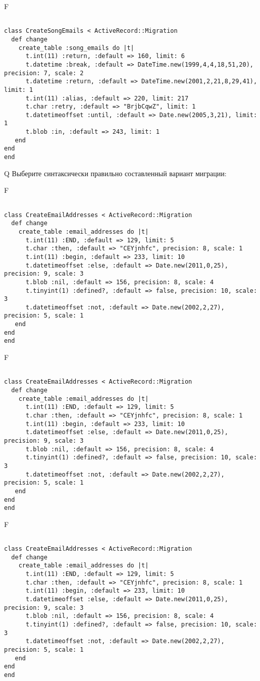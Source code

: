 F
\begin{verbatim}
		
class CreateSongEmails < ActiveRecord::Migration 
  def change 
    create_table :song_emails do |t| 
      t.int(11) :return, :default => 160, limit: 6
      t.datetime :break, :default => DateTime.new(1999,4,4,18,51,20), precision: 7, scale: 2
      t.datetime :return, :default => DateTime.new(2001,2,21,8,29,41), limit: 1
      t.int(11) :alias, :default => 220, limit: 217
      t.char :retry, :default => "BrjbCqwZ", limit: 1
      t.datetimeoffset :until, :default => Date.new(2005,3,21), limit: 1
      t.blob :in, :default => 243, limit: 1
   end
end
end
\end{verbatim}

Q
Выберите синтаксически правильно составленный вариант миграции:

F
\begin{verbatim}
		
class CreateEmailAddresses < ActiveRecord::Migration 
  def change 
    create_table :email_addresses do |t| 
      t.int(11) :END, :default => 129, limit: 5
      t.char :then, :default => "CEYjnhfc", precision: 8, scale: 1
      t.int(11) :begin, :default => 233, limit: 10
      t.datetimeoffset :else, :default => Date.new(2011,0,25), precision: 9, scale: 3
      t.blob :nil, :default => 156, precision: 8, scale: 4
      t.tinyint(1) :defined?, :default => false, precision: 10, scale: 3
      t.datetimeoffset :not, :default => Date.new(2002,2,27), precision: 5, scale: 1
   end
end
end
\end{verbatim}

F
\begin{verbatim}
		
class CreateEmailAddresses < ActiveRecord::Migration 
  def change 
    create_table :email_addresses do |t| 
      t.int(11) :END, :default => 129, limit: 5
      t.char :then, :default => "CEYjnhfc", precision: 8, scale: 1
      t.int(11) :begin, :default => 233, limit: 10
      t.datetimeoffset :else, :default => Date.new(2011,0,25), precision: 9, scale: 3
      t.blob :nil, :default => 156, precision: 8, scale: 4
      t.tinyint(1) :defined?, :default => false, precision: 10, scale: 3
      t.datetimeoffset :not, :default => Date.new(2002,2,27), precision: 5, scale: 1
   end
end
end
\end{verbatim}

F
\begin{verbatim}
		
class CreateEmailAddresses < ActiveRecord::Migration 
  def change 
    create_table :email_addresses do |t| 
      t.int(11) :END, :default => 129, limit: 5
      t.char :then, :default => "CEYjnhfc", precision: 8, scale: 1
      t.int(11) :begin, :default => 233, limit: 10
      t.datetimeoffset :else, :default => Date.new(2011,0,25), precision: 9, scale: 3
      t.blob :nil, :default => 156, precision: 8, scale: 4
      t.tinyint(1) :defined?, :default => false, precision: 10, scale: 3
      t.datetimeoffset :not, :default => Date.new(2002,2,27), precision: 5, scale: 1
   end
end
end
\end{verbatim}

